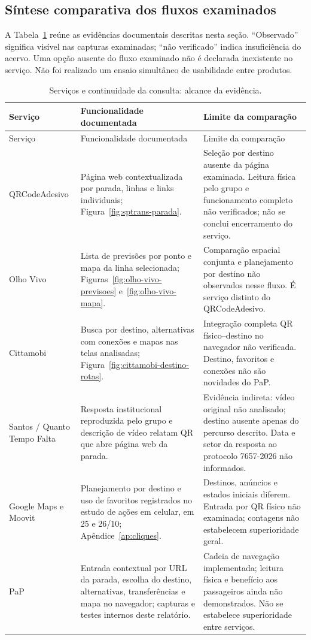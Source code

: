 \subsection*{Síntese comparativa dos fluxos examinados}
\label{sec:comparacao-servicos}
A Tabela~\ref{tab:comparacao-servicos} reúne as evidências documentais descritas nesta seção. ``Observado'' significa visível nas capturas examinadas; ``não verificado'' indica insuficiência do acervo. Uma opção ausente do fluxo examinado não é declarada inexistente no serviço. Não foi realizado um ensaio simultâneo de usabilidade entre produtos.
\begingroup\small\SingleSpacing\setlength{\parskip}{0pt}\setlength{\tabcolsep}{4pt}
\begin{longtable}{>{\raggedright\arraybackslash}p{2.4cm}p{5.5cm}p{6.8cm}}
\caption{Serviços e continuidade da consulta: alcance da evidência.}\label{tab:comparacao-servicos}\\\hline
Serviço & Funcionalidade documentada & Limite da comparação\\\hline\endfirsthead
\hline Serviço & Funcionalidade documentada & Limite da comparação\\\hline\endhead
\hline\endfoot
QRCodeAdesivo & Página web contextualizada por parada, linhas e links individuais; Figura~\ref{fig:sptrans-parada}. & Seleção por destino ausente da página examinada. Leitura física pelo grupo e funcionamento completo não verificados; não se conclui encerramento do serviço.\\[5pt]
Olho Vivo & Lista de previsões por ponto e mapa da linha selecionada; Figuras~\ref{fig:olho-vivo-previsoes} e~\ref{fig:olho-vivo-mapa}. & Comparação espacial conjunta e planejamento por destino não observados nesse fluxo. É serviço distinto do QRCodeAdesivo.\\[5pt]
Cittamobi & Busca por destino, alternativas com conexões e mapas nas telas analisadas; Figura~\ref{fig:cittamobi-destino-rotas}. & Integração completa QR físico--destino no navegador não verificada. Destino, favoritos e conexões não são novidades do PaP.\\[5pt]
Santos / Quanto Tempo Falta & Resposta institucional reproduzida pelo grupo e descrição de vídeo relatam QR que abre página web da parada. & Evidência indireta: vídeo original não analisado; destino ausente apenas do percurso descrito. Data e setor da resposta ao protocolo 7657-2026 não informados.\\[5pt]
Google Maps e Moovit & Planejamento por destino e uso de favoritos registrados no estudo de ações em celular, em 25 e 26/10; Apêndice~\ref{ap:cliques}. & Destinos, anúncios e estados iniciais diferem. Entrada por QR físico não examinada; contagens não estabelecem superioridade geral.\\[5pt]
PaP & Entrada contextual por URL da parada, escolha do destino, alternativas, transferências e mapa no navegador; capturas e testes internos deste relatório. & Cadeia de navegação implementada; leitura física e benefício aos passageiros ainda não demonstrados. Não se estabelece superioridade entre serviços.\\
\end{longtable}
